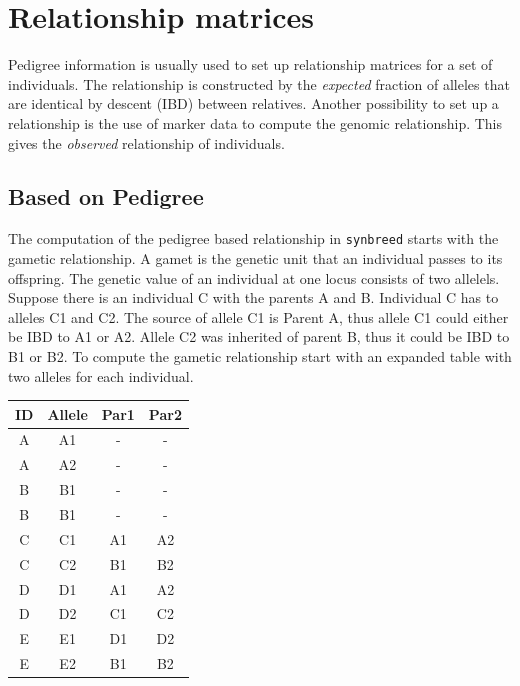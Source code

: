 \documentclass[a4paper,11pt]{article}
\begin{document}
  

\section{Relationship matrices}\label{sec:RelationshipMatrices}  

Pedigree information is usually used to set up relationship matrices for a set of individuals. The relationship is constructed by the \textit{expected} fraction of alleles that are identical by descent (IBD) between relatives. Another possibility to set up a relationship is the use of marker data to compute the genomic relationship. This gives the \textit{observed} relationship of individuals.

\subsection{Based on Pedigree}

The computation of the pedigree based relationship in \texttt{synbreed} starts with the gametic relationship. A gamet is the genetic unit that an individual passes to its offspring. The genetic value of an individual at one locus consists of two allelels. 
Suppose there is an individual C with the parents A and B. Individual C has to alleles C1 and C2. The source of allele C1 is Parent A, thus allele C1 could either be IBD to A1 or A2. Allele C2 was inherited of parent B, thus it could be IBD to B1 or B2. 
To compute the gametic relationship start with an expanded table with two alleles for each individual. 
 
\begin{table}[!h]
\centering
\begin{tabular}{cccc}
\hline
ID & Allele & Par1 & Par2 \\
\hline
A & A1 & - & - \\
A & A2 & - & - \\
B & B1 & - & - \\
B & B1 & - & - \\
C & C1 & A1 & A2 \\
C & C2 & B1 & B2 \\
D & D1 & A1 & A2 \\
D & D2 & C1 & C2 \\
E & E1 & D1 & D2 \\
E & E2 & B1 & B2 \\
\hline
\end{tabular}
\end{table}
\end{document}
